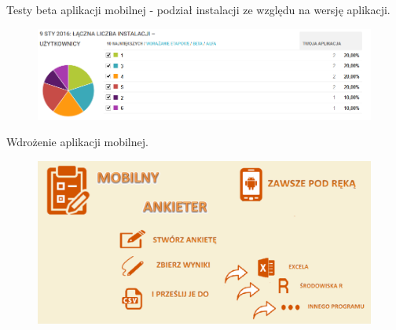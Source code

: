 \documentclass[a4paper,10pt]{beamer}
\begin{document}
		\begin{frame}{Testy beta aplikacji mobilnej - podział instalacji ze względu na wersję aplikacji.}	
			\begin{figure}[H]
				\includegraphics[scale=0.5]{prezentacja_obronaII_zdjecia/wersja_aplikacji.png}
			\end{figure}
		\end{frame}
			\begin{frame}{Wdrożenie aplikacji mobilnej.}	
				\begin{figure}[H]
					\includegraphics[scale=0.42]{prezentacja_obronaII_zdjecia/baner.png}
				\end{figure}
			\end{frame}
\end{document}
